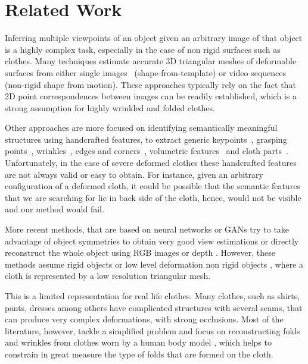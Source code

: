 \section{Related Work}

Inferring multiple viewpoints of an object given an arbitrary image of that object is a highly complex task, especially in the case of non rigid surfaces such as clothes.
Many techniques estimate accurate 3D triangular meshes of deformable surfaces from either single images~\cite{Parashar2019pami,Moreno_pami2013,pumarola2018geometry} (shape-from-template) or video sequences~\cite{Agudo_pami2016,Agudo2017ijcv,Chhatkuli2016cvpr,Moreno_cvpr2011b} (non-rigid shape from motion). These approaches typically rely on the fact that 2D point correspondences between images can be readily established, which is a strong assumption for highly wrinkled and folded clothes. 

Other approaches are more focused on identifying semantically meaningful structures using handcrafted features, to extract generic keypoints~\cite{Simo_ijcv2015}, grasping points~\cite{Ramisa_pr2016,doumanoglou2014active}, wrinkles~\cite{kapusta2019personalized,martinez2017recognition}, edges and corners~\cite{kampouris2016multi}, volumetric features~\cite{li2015folding} and cloth parts~\cite{Ramisa2012using}. Unfortunately, in the case of severe deformed clothes these handcrafted features are not always valid or easy to obtain. For instance, given an arbitrary configuration of a deformed cloth, it could be possible that the semantic features that we are searching for lie in back side of the cloth, hence, would not be visible and our method would fail.

More recent methods, that are based on neural networks \cite{pumarola2020c,haeni2020corn,xie2019pix2vox} or GANs \cite{HoloGAN2019} try to take advantage of object symmetries to obtain very good view estimations or directly reconstruct the whole object using RGB images \cite{zhou2020learning, yan2016perspective, varley2017shape} or depth \cite{yang-depth-w}. However, these methods assume rigid objects or low level deformation non rigid objects \cite{Tsoli_2019_ICCV, golyanik2018hdm}, where a cloth is represented by a low resolution triangular mesh.

This is a limited representation for  real life clothes. Many clothes, such as shirts, pants, dresses among others have complicated structures with several seams, that can produce very complex deformations, with strong occlusions. Most of the literature, however, tackle a simplified problem and focus on    reconstructing folds and wrinkles from clothes worn by a human body model \cite{Gundogdu-ICCV-2019, Santesteban-EG-2019, SIZER_Dataset, Patel_2020_CVPR}, which helps to constrain in great measure the type of folds that are formed on the cloth.

